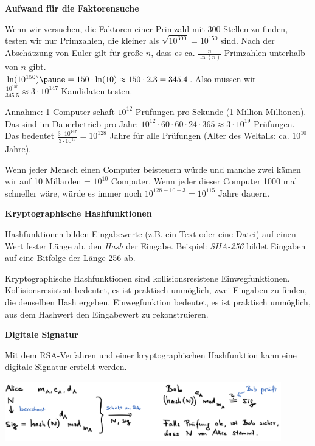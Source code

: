 \begin{frame}[fragile]

\textbf{Aufwand für die Faktorensuche} \pause

Wenn wir versuchen, die Faktoren einer Primzahl mit 300 Stellen zu finden, testen wir nur Primzahlen, die kleiner als
$\sqrt{10^{300}} = 10^{150}$ sind. \pause Nach der Abschätzung von Euler gilt für große $n$, dass es ca. $\frac{n}{\ln(n)}$ Primzahlen unterhalb von $n$ gibt. \\ \pause
$\ln(10^{150}) \pause = 150 \cdot \ln(10) \approx 150 \cdot 2.3 = 345.4$. \pause Also müssen wir $\frac{10^{150}}{345.5} \approx 3 \cdot 10^{147}$ Kandidaten testen. \pause

Annahme: 1 Computer schaft $10^{12}$ Prüfungen pro Sekunde (1 Million Millionen). \pause Das sind im Dauerbetrieb pro Jahr: 
$10^{12} \cdot 60 \cdot 60 \cdot 24 \cdot 365 \approx 3 \cdot 10^{19}$ Prüfungen. \pause Das bedeutet  
$\frac{3 \cdot 10^{147}}{3 \cdot 10^{19}} = 10^{128}$ Jahre für alle Prüfungen (Alter des Weltalls: ca. $10^{10}$ Jahre). \pause

Wenn jeder Mensch einen Computer beisteuern würde und manche zwei kämen wir auf 10 Millarden = $10^{10}$ Computer. \pause Wenn jeder dieser Computer 1000 mal schneller wäre, würde es immer noch $10^{128-10-3} = 10^{115}$ Jahre dauern.
\end{frame}

\begin{frame}[fragile]

\textbf{Kryptographische Hashfunktionen} \pause

Hashfunktionen bilden Eingabewerte (z.B. ein Text oder eine Datei) auf einen Wert fester Länge ab, den \textit{Hash} der Eingabe. \pause Beispiel: \textit{SHA-256} bildet Eingaben auf eine Bitfolge der Länge 256 ab. \pause

Kryptographische Hashfunktionen sind kollisionsresistene Einwegfunktionen. \pause Kollisionsresistent bedeutet, es ist praktisch unmöglich, zwei Eingaben zu finden, die denselben Hash ergeben. \pause Einwegfunktion bedeutet, es ist praktisch unmöglich, aus dem Hashwert den Eingabewert zu rekonstruieren.

\end{frame}

\begin{frame}[fragile]

\textbf{Digitale Signatur}

Mit dem RSA-Verfahren und einer kryptographischen Hashfunktion kann eine digitale Signatur erstellt werden. \pause

\includegraphics[width=12cm]{bild4.png}
\end{frame}


